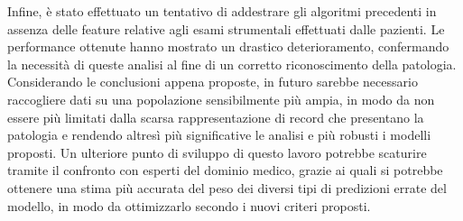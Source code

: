Infine, è stato effettuato un tentativo di addestrare gli algoritmi precedenti in assenza delle feature relative agli esami strumentali effettuati dalle pazienti. Le performance ottenute hanno mostrato un drastico deterioramento, confermando la necessità di queste analisi al fine di un corretto riconoscimento della patologia.
Considerando le conclusioni appena proposte, in futuro sarebbe necessario raccogliere dati su una popolazione sensibilmente più ampia, in modo da non essere più limitati dalla scarsa rappresentazione di record che presentano la patologia e rendendo altresì più significative le analisi e più robusti i modelli proposti.
Un ulteriore punto di sviluppo di questo lavoro potrebbe scaturire tramite il confronto con esperti del dominio medico, grazie ai quali si potrebbe ottenere una stima più accurata del peso dei diversi tipi di predizioni errate del modello, in modo da ottimizzarlo secondo i nuovi criteri proposti.